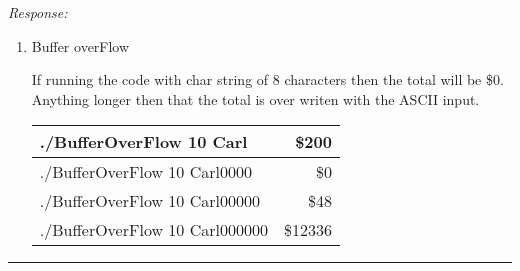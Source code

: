\documentclass[a4paper, 11pt]{article}
\newenvironment{response}
                {\textit{Response:}}
                {}
\begin{document}
\begin{response}
\begin{enumerate}[label=\arabic*.]
  \item
    Buffer overFlow
    
    If running the code with char string  of 8 characters then the total will be \$0. Anything longer then that the total is over writen with the ASCII input.

    \begin{table}[h!]
      \centering
      \label{tab:Buffer OverFlow Results}
      \begin{tabular}{|l|r|}
        \hline
        ./BufferOverFlow 10 Carl & \$200 \\ \hline
        ./BufferOverFlow 10 Carl0000 & \$0 \\ \hline
        ./BufferOverFlow 10 Carl00000 & \$48 \\ \hline
        ./BufferOverFlow 10 Carl000000 & \$12336 \\ \hline
      \end{tabular}
    \end{table}
  \end{enumerate}
\end{response}
\noindent\rule{7in}{2.8pt}
\end{document}
